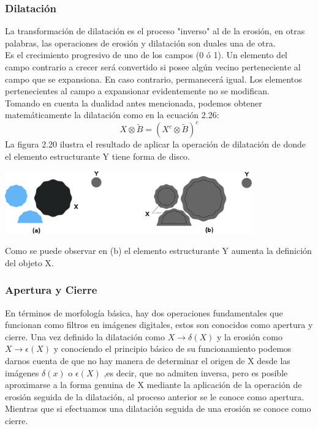 \subsubsection{Dilatación}
La transformación de dilatación es el proceso "inverso" al de la erosión, en otras palabras, las operaciones de erosión y dilatación son duales una de otra.\\
Es el crecimiento progresivo de uno de los campos (0 ó 1). Un elemento del
campo contrario a crecer será convertido si posee algún vecino perteneciente al campo
que se expansiona. En caso contrario, permanecerá igual. Los elementos pertenecientes
al campo a expansionar evidentemente no se modifican.\cite{Book:Jose2005}\\
Tomando en cuenta la dualidad antes mencionada, podemos obtener matemáticamente la dilatación como en la ecuación 2.26:
\begin{equation}
	X \otimes \tilde{B} = (X^c \otimes \tilde{B})^c
\end{equation}
La figura 2.20 ilustra el resultado de aplicar la operación de dilatación de donde el elemento estructurante Y tiene forma de disco.
\begin{center}
	\includegraphics[width=0.8\textwidth]{Contenido/Cuerpo/Capitulo2/Fig15.eps}
	\label{fig:MarcoTeorico:Fig23}
\end{center}
Como se puede observar en (b) el elemento estructurante Y aumenta la definición del objeto X.

\subsubsection{Apertura y Cierre}
En términos de morfología básica, hay dos operaciones fundamentales que funcionan como filtros en imágenes digitales, estos son conocidos como apertura
y cierre. Una vez definido la dilatación como $X \rightarrow \delta(X)$ y la erosión como $X \rightarrow \epsilon(X)$ y conociendo el principio
básico de su funcionamiento podemos darnos cuenta de que no hay manera de determinar el origen de X desde las imágenes $\delta(x)$ o $\epsilon(X)$
,es decir, que no admiten inversa, pero es posible aproximarse a la forma genuina de X mediante la aplicación de la operación de erosión
seguida de la dilatación, al proceso anterior se le conoce como apertura. Mientras que si efectuamos una dilatación seguida de una erosión se conoce
como cierre.

